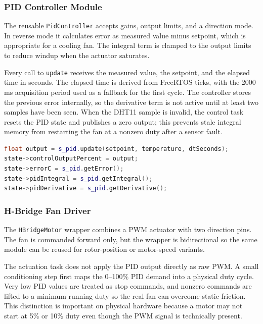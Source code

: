\subsubsection{PID Controller Module}

The reusable \texttt{PidController} accepts gains, output limits, and a direction mode. In reverse mode it calculates error as measured value minus setpoint, which is appropriate for a cooling fan. The integral term is clamped to the output limits to reduce windup when the actuator saturates.

Every call to \texttt{update} receives the measured value, the setpoint, and the elapsed time in seconds. The elapsed time is derived from FreeRTOS ticks, with the 2000 ms acquisition period used as a fallback for the first cycle. The controller stores the previous error internally, so the derivative term is not active until at least two samples have been seen. When the DHT11 sample is invalid, the control task resets the PID state and publishes a zero output; this prevents stale integral memory from restarting the fan at a nonzero duty after a sensor fault.

\begin{lstlisting}[language=C++, caption=PID update interface, label=lst:pid_update]
float output = s_pid.update(setpoint, temperature, dtSeconds);
state->controlOutputPercent = output;
state->errorC = s_pid.getError();
state->pidIntegral = s_pid.getIntegral();
state->pidDerivative = s_pid.getDerivative();
\end{lstlisting}

\subsubsection{H-Bridge Fan Driver}

The \texttt{HBridgeMotor} wrapper combines a PWM actuator with two direction pins. The fan is commanded forward only, but the wrapper is bidirectional so the same module can be reused for rotor-position or motor-speed variants.

The actuation task does not apply the PID output directly as raw PWM. A small conditioning step first maps the 0--100\% PID demand into a physical duty cycle. Very low PID values are treated as stop commands, and nonzero commands are lifted to a minimum running duty so the real fan can overcome static friction. This distinction is important on physical hardware because a motor may not start at 5\% or 10\% duty even though the PWM signal is technically present.

